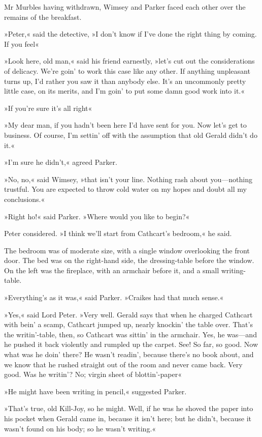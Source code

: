 Mr Murbles having withdrawn, Wimsey and Parker faced each other over the remains of the breakfast.

»Peter,« said the detective, »I don't know if I've done the right thing by coming. If you feel\longdash«

»Look here, old man,« said his friend earnestly, »let's cut out the considerations of delicacy. We're goin' to work this case like any other. If anything unpleasant turns up, I'd rather you saw it than anybody else. It's an uncommonly pretty little case, on its merits, and I'm goin' to put some damn good work into it.«

»If you're sure it's all right\longdash«

»My dear man, if you hadn't been here I'd have sent for you. Now let's get to business. Of course, I'm settin' off with the assumption that old Gerald didn't do it.«

»I'm sure he didn't,« agreed Parker.

»No, no,« said Wimsey, »that isn't your line. Nothing rash about you—nothing trustful. You are expected to throw cold water on my hopes and doubt all my conclusions.«

»Right ho!« said Parker. »Where would you like to begin?«

Peter considered. »I think we'll start from Cathcart's bedroom,« he said.

The bedroom was of moderate size, with a single window overlooking the front door. The bed was on the right-hand side, the dressing-table before the window. On the left was the fireplace, with an armchair before it, and a small writing-table.

»Everything's as it was,« said Parker. »Craikes had that much sense.«

»Yes,« said Lord Peter. »Very well. Gerald says that when he charged Cathcart with bein' a scamp, Cathcart jumped up, nearly knockin' the table over. That's the writin'-table, then, so Cathcart was sittin' in the armchair. Yes, he was—and he pushed it back violently and rumpled up the carpet. See! So far, so good. Now what was he doin' there? He wasn't readin', because there's no book about, and we know that he rushed straight out of the room and never came back. Very good. Was he writin'? No; virgin sheet of blottin'-paper\longdash«

»He might have been writing in pencil,« suggested Parker.

»That's true, old Kill-Joy, so he might. Well, if he was he shoved the paper into his pocket when Gerald came in, because it isn't here; but he didn't, because it wasn't found on his body; so he wasn't writing.«

